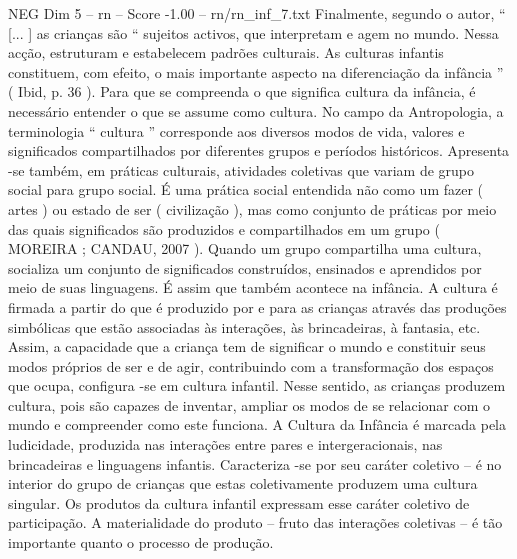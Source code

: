 \begin{textsample}{NEG Dim 5 – rn – Score -1.00 – rn/rn\_inf\_7.txt}
Finalmente, segundo o autor, “ [... ] as crianças são “ sujeitos activos, que interpretam e agem no mundo.
Nessa acção, estruturam e estabelecem padrões culturais.
As culturas infantis constituem, com efeito, o mais importante aspecto na diferenciação da infância ” ( Ibid, p. 36 ).
Para que se compreenda o que significa cultura da infância, é necessário entender o que se assume como cultura.
No campo da Antropologia, a terminologia “ cultura ” corresponde aos diversos modos de vida, valores e significados compartilhados por diferentes grupos e períodos históricos.
Apresenta -se também, em práticas culturais, atividades coletivas que variam de grupo social para grupo social.
É uma prática social entendida não como um fazer ( artes ) ou estado de ser ( civilização ), mas como conjunto de práticas por meio das quais significados são produzidos e compartilhados em um grupo ( MOREIRA ; CANDAU, 2007 ).
Quando um grupo compartilha uma cultura, socializa um conjunto de significados construídos, ensinados e aprendidos por meio de suas linguagens.
É assim que também acontece na infância.
A cultura é firmada a partir do que é produzido por e para as crianças através das produções simbólicas que estão associadas às interações, às brincadeiras, à fantasia, etc.
Assim, a capacidade que a criança tem de significar o mundo e constituir seus modos próprios de ser e de agir, contribuindo com a transformação dos espaços que ocupa, configura -se em cultura infantil.
Nesse sentido, as crianças produzem cultura, pois são capazes de inventar, ampliar os modos de se relacionar com o mundo e compreender como este funciona.
A Cultura da Infância é marcada pela ludicidade, produzida nas interações entre pares e intergeracionais, nas brincadeiras e linguagens infantis.
Caracteriza -se por seu caráter coletivo – é no interior do grupo de crianças que estas coletivamente produzem uma cultura singular.
Os produtos da cultura infantil expressam esse caráter coletivo de participação.
A materialidade do produto – fruto das interações coletivas – é tão importante quanto o processo de produção.

\end{textsample}
